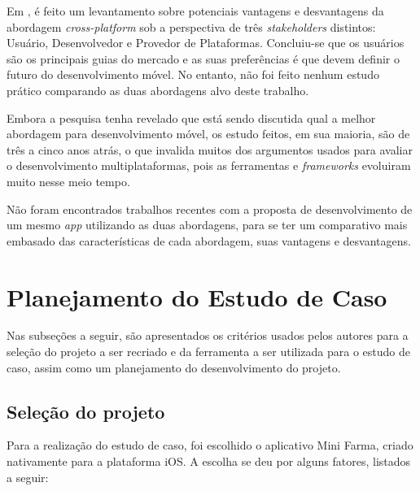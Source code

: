 Em , é feito um levantamento sobre potenciais vantagens e desvantagens da abordagem \textit{cross-platform} sob a 
perspectiva de três \textit{stakeholders} distintos: Usuário, Desenvolvedor e Provedor de Plataformas. Concluiu-se que os usuários são os principais
guias do mercado e as suas preferências é que devem definir o futuro do desenvolvimento móvel. No entanto, não foi feito nenhum estudo prático comparando
as duas abordagens alvo deste trabalho.

Embora a pesquisa tenha revelado que está sendo discutida qual a melhor abordagem para desenvolvimento móvel, os estudo feitos, em sua maioria, são de três a cinco 
anos atrás, o que invalida muitos dos argumentos usados para avaliar o desenvolvimento multiplataformas, pois as ferramentas e \textit{frameworks} evoluiram muito nesse
meio tempo. 

Não foram encontrados trabalhos recentes com a proposta de desenvolvimento de um mesmo \textit{app} utilizando as duas abordagens, para se ter um comparativo mais embasado das
características de cada abordagem, suas vantagens e desvantagens.
 
\begin{comment}
Falar que tem mt trabalho comparativo de nativo e cross, mas não refletem a atualidades, pois mudou muito em poucos anos.
e nao ha um estudo comparativo
tenho 3 plataformas, o cross surgiu como uma solucao, e queremos confirmar se eh mesmo uma solucao
da pra confiar nessa abordagem pra todos os desenvolvimentos de apps?    
\end{comment}

\section{Planejamento do Estudo de Caso} \label{section:planejamentoestudodecaso}

Nas subseções a seguir, são apresentados os critérios usados pelos autores para a seleção do projeto a ser recriado e da ferramenta a ser utilizada para o estudo de caso, assim como um planejamento
do desenvolvimento do projeto.

\subsection{Seleção do projeto} \label{subsection:selecaodoprojeto}

Para a realização do estudo de caso, foi escolhido o aplicativo Mini Farma, criado nativamente para a plataforma iOS. A escolha se deu por alguns fatores, listados a seguir:

